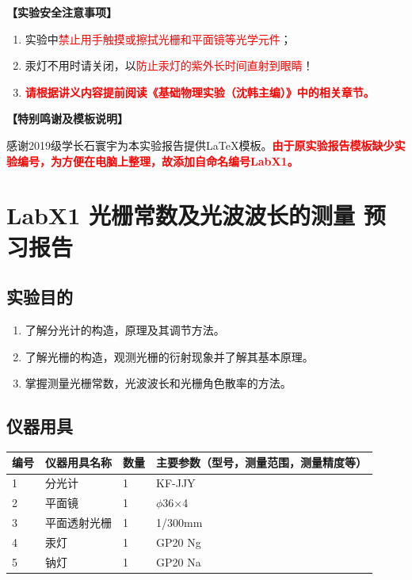\documentclass[dvipsnames, svgnames,a4paper,11pt]{article}
\begin{document}
	\textbf{【实验安全注意事项】}	
	\begin{enumerate}
		\item 实验中\textcolor{red}{禁止用手触摸或擦拭光栅和平面镜等光学元件}；
		\item 汞灯不用时请关闭，以\textcolor{red}{防止汞灯的紫外长时间直射到眼睛}！
		\item \textcolor{red}{\textbf{请根据讲义内容提前阅读《基础物理实验（沈韩主编）》中的相关章节。}}
	\end{enumerate}
	
	\textbf{【特别鸣谢及模板说明】}	
	
	感谢2019级学长石寰宇为本实验报告提供\LaTeX 模板。\textcolor{red}{\textbf{由于原实验报告模板缺少实验编号，为方便在电脑上整理，故添加自命名编号LabX1。}}
	
	
	
	\clearpage
	\tableofcontents
	\clearpage
	
	
	
	\setcounter{section}{0}
	\section{LabX1 光栅常数及光波波长的测量 \quad\heiti 预习报告}
	
	\subsection{实验目的}
	\begin{enumerate}
		\item 了解分光计的构造，原理及其调节方法。
		\item 了解光栅的构造，观测光栅的衍射现象并了解其基本原理。
		\item 掌握测量光栅常数，光波波长和光栅角色散率的方法。
	\end{enumerate}
	
	\subsection{仪器用具}
	\begin{table}[htbp]
		\centering
		\renewcommand\arraystretch{1.6}
		\begin{tabular}{p{}|p{}|p{}|p{}}
			\hline
			编号& 仪器用具名称 & 数量 &  主要参数（型号，测量范围，测量精度等） \\
			\hline
			1& 分光计 &1 & KF-JJY \\
			
			2& 平面镜 &1 & $\phi$36×4 \\
			
			3& 平面透射光栅 & 1 & 1/300mm \\
			
			4& 汞灯 & 1 & GP20 Ng \\
			
			5& 钠灯 & 1 & GP20 Na \\
			\hline
		\end{tabular}
	\end{table}
	
\end{document}
